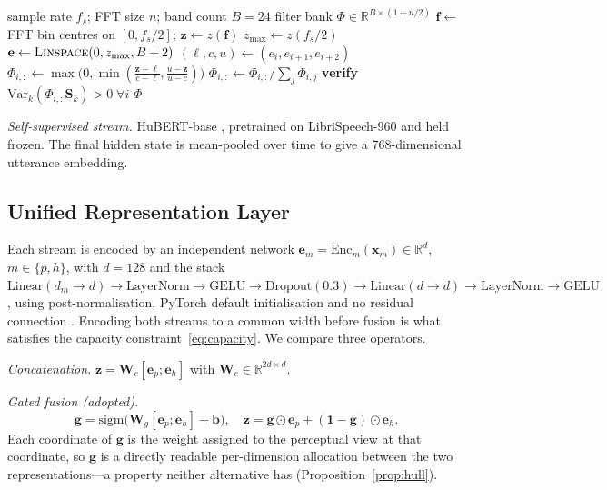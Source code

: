 \documentclass[journal,onecolumn,11pt,draftclsnofoot]{IEEEtran}   %
\begin{document}
\begin{algorithm}[!t]
\caption{Nyquist-adaptive Bark filter bank}
\label{alg:bark}
\begin{algorithmic}[1]
\Require sample rate $f_s$; FFT size $n$; band count $B = 24$
\Ensure filter bank $\Phi \in \mathbb{R}^{B \times (1 + n/2)}$
\State $\mathbf{f} \gets$ FFT bin centres on $[0, f_s/2]$; \;
       $\mathbf{z} \gets z(\mathbf{f})$ 
\State $z_{\max} \gets z(f_s/2)$
\State $\mathbf{e} \gets \textsc{Linspace}(0, z_{\max}, B+2)$
  \State $(\ell, c, u) \gets (e_i, e_{i+1}, e_{i+2})$
  \State $\Phi_{i,:} \gets \max\!\big(0, \min(\tfrac{\mathbf{z}-\ell}{c-\ell},
         \tfrac{u-\mathbf{z}}{u-c})\big)$
  \State $\Phi_{i,:} \gets \Phi_{i,:} / \textstyle\sum_j \Phi_{i,j}$
\EndFor
\State \textbf{verify} $\mathrm{Var}_k(\Phi_{i,:}\mathbf{S}_k) > 0\;\forall i$
\State \Return $\Phi$
\end{algorithmic}
\end{algorithm}

\emph{Self-supervised stream.} HuBERT-base \cite{hsu2021hubert}, pretrained on
LibriSpeech-960 and held frozen. The final hidden state is mean-pooled over time
to give a 768-dimensional utterance embedding.

\subsection{Unified Representation Layer}
\label{sec:fusion-design}
Each stream is encoded by an independent network
$\mathbf{e}_m = \mathrm{Enc}_m(\mathbf{x}_m) \in \mathbb{R}^{d}$, $m\in\{p,h\}$,
with $d = 128$ and the stack
$\mathrm{Linear}(d_m\!\to\! d) \rightarrow \mathrm{LayerNorm} \rightarrow
\mathrm{GELU} \rightarrow \mathrm{Dropout}(0.3) \rightarrow
\mathrm{Linear}(d\!\to\! d) \rightarrow \mathrm{LayerNorm} \rightarrow
\mathrm{GELU}$, using post-normalisation, PyTorch default initialisation and no
residual connection \cite{ba2016layernorm,hendrycks2016gelu,srivastava2014dropout}.
Encoding both streams to a common width before fusion is what satisfies the
capacity constraint~\eqref{eq:capacity}. We compare three operators.

\emph{Concatenation.} $\mathbf{z} = \mathbf{W}_c[\mathbf{e}_p;\mathbf{e}_h]$
with $\mathbf{W}_c \in \mathbb{R}^{2d\times d}$.

\emph{Gated fusion (adopted).}
\begin{equation}
  \mathbf{g} = \mathrm{sigm}\!\big(\mathbf{W}_g[\mathbf{e}_p;\mathbf{e}_h]
    + \mathbf{b}\big), \quad
  \mathbf{z} = \mathbf{g}\odot\mathbf{e}_p + (\mathbf{1}-\mathbf{g})
  \odot\mathbf{e}_h .
  \label{eq:gate}
\end{equation}
Each coordinate of $\mathbf{g}$ is the weight assigned to the perceptual view at
that coordinate, so $\mathbf{g}$ is a directly readable per-dimension allocation
between the two representations---a property neither alternative has
(Proposition~\ref{prop:hull}).
\end{document}
